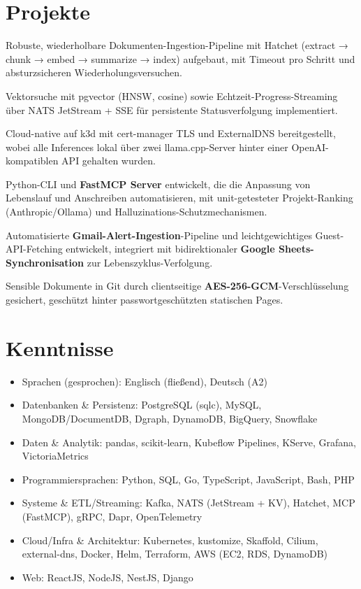 \documentclass[10pt,a4paper]{resume}
\begin{document}
\section{Projekte}

\bullets
  \item Robuste, wiederholbare Dokumenten-Ingestion-Pipeline mit Hatchet (extract → chunk → embed → summarize → index) aufgebaut, mit Timeout pro Schritt und absturzsicheren Wiederholungsversuchen.
  \item Vektorsuche mit pgvector (HNSW, cosine) sowie Echtzeit-Progress-Streaming über NATS JetStream + SSE für persistente Statusverfolgung implementiert.
  \item Cloud-native auf k3d mit cert-manager TLS und ExternalDNS bereitgestellt, wobei alle Inferences lokal über zwei llama.cpp-Server hinter einer OpenAI-kompatiblen API gehalten wurden.
\bulletsend
\vspace{1.0pt}
\bullets
  \item Python-CLI und \textbf{FastMCP Server} entwickelt, die die Anpassung von Lebenslauf und Anschreiben automatisieren, mit unit-getesteter Projekt-Ranking (Anthropic/Ollama) und Halluzinations-Schutzmechanismen.
  \item Automatisierte \textbf{Gmail-Alert-Ingestion}-Pipeline und leichtgewichtiges Guest-API-Fetching entwickelt, integriert mit bidirektionaler \textbf{Google Sheets-Synchronisation} zur Lebenszyklus-Verfolgung.
  \item Sensible Dokumente in Git durch clientseitige \textbf{AES-256-GCM}-Verschlüsselung gesichert, geschützt hinter passwortgeschützten statischen Pages.
\bulletsend

\section{Kenntnisse}

\begin{itemize}[leftmargin=1.4em,nosep,topsep=2pt]
  \item Sprachen (gesprochen): Englisch (fließend), Deutsch (A2)
  \item Datenbanken \& Persistenz: PostgreSQL (sqlc), MySQL, MongoDB/DocumentDB, Dgraph, DynamoDB, BigQuery, Snowflake
  \item Daten \& Analytik: pandas, scikit-learn, Kubeflow Pipelines, KServe, Grafana, VictoriaMetrics
  \item Programmiersprachen: Python, SQL, Go, TypeScript, JavaScript, Bash, PHP
  \item Systeme \& ETL/Streaming: Kafka, NATS (JetStream + KV), Hatchet, MCP (FastMCP), gRPC, Dapr, OpenTelemetry
  \item Cloud/Infra \& Architektur: Kubernetes, kustomize, Skaffold, Cilium, external-dns, Docker, Helm, Terraform, AWS (EC2, RDS, DynamoDB)
  \item Web: ReactJS, NodeJS, NestJS, Django
\end{itemize}
\end{document}
